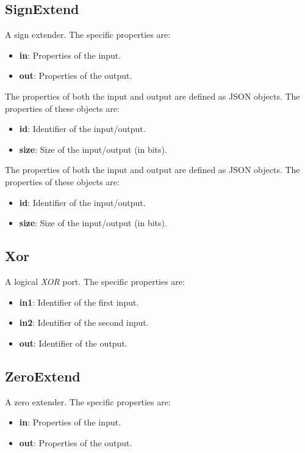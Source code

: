 \documentclass[11pt,a4paper,twoside,titlepage]{report}
\begin{document}
\subsection{SignExtend}

A sign extender. The specific properties are:
\begin{itemize}
	\item \textbf{in}: Properties of the input.
	\item \textbf{out}: Properties of the output.
\end{itemize}

The properties of both the input and output are defined as JSON objects. 
The properties of these objects are:
\begin{itemize}
	\item \textbf{id}: Identifier of the input/output.
	\item \textbf{size}: Size of the input/output (in bits).
\end{itemize}

The properties of both the input and output are defined as JSON objects. 
The properties of these objects are:
\begin{itemize}
	\item \textbf{id}: Identifier of the input/output.
	\item \textbf{size}: Size of the input/output (in bits).
\end{itemize}

\subsection{Xor}

A logical \emph{XOR} port. The specific properties are:
\begin{itemize}
	\item \textbf{in1}: Identifier of the first input.
	\item \textbf{in2}: Identifier of the second input.
	\item \textbf{out}: Identifier of the output.
\end{itemize}

\subsection{ZeroExtend}

A zero extender. The specific properties are:
\begin{itemize}
	\item \textbf{in}: Properties of the input.
	\item \textbf{out}: Properties of the output.
\end{itemize}
\end{document}
